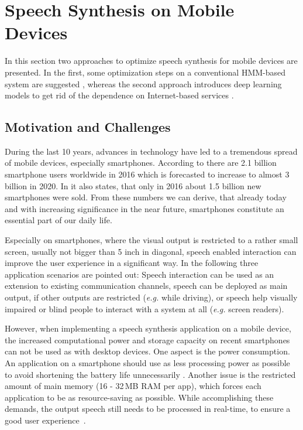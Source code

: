 \section{Speech Synthesis on Mobile Devices}
\label{sec:embeddedspeech}

In this section two approaches to optimize speech synthesis for mobile devices are presented. In the first, some optimization steps on a conventional \ac{HMM}-based system are suggested \cite{toth:optimizing}, whereas the second approach introduces deep learning models to get rid of the dependence on Internet-based services \cite{boros:robust}.

\subsection{Motivation and Challenges}
\label{subsec:motembedded}

During the last 10 years, advances in technology have led to a tremendous spread of mobile devices, especially smartphones. According to \cite{statista:smartphones} there are 2.1 billion smartphone users worldwide in 2016 which is forecasted to increase to almost 3 billion in 2020. In \cite{statista:smartphones} it also states, that only in 2016 about 1.5 billion new smartphones were sold. From these numbers we can derive, that already today and with increasing significance in the near future, smartphones constitute an essential part of our daily life.

Especially on smartphones, where the visual output is restricted to a rather small screen, usually not bigger than 5 inch in diagonal, speech enabled interaction can improve the user experience in a significant way. In \cite{toth:optimizing} the following three application scenarios are pointed out: Speech interaction can be used as an extension to existing communication channels, speech can be deployed as main output, if other outputs are restricted (\textit{e.g.} while driving), or speech help visually impaired or blind people to interact with a system at all (\textit{e.g.} screen readers).

However, when implementing a speech synthesis application on a mobile device, the increased computational power and storage capacity on recent smartphones can not be used as with desktop devices. One aspect is the power consumption. An application on a smartphone should use as less processing power as possible to avoid shortening the battery life unnecessarily \cite{toth:optimizing}. Another issue is the restricted amount of main memory (16 - 32\,MB RAM per app), which forces each application to be as resource-saving as possible. While accomplishing these demands, the output speech still needs to be processed in real-time, to ensure a good user experience~\cite{boros:robust}.

